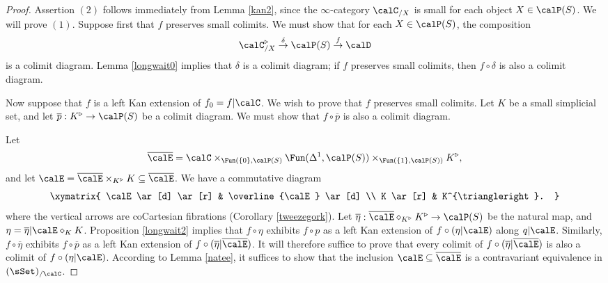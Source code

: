 \begin{proof}
Assertion $(2)$ follows immediately from Lemma \ref{kan2}, since the $\infty$-category
$\calC_{/X}$ is small for each object $X \in \calP(S)$. We will prove $(1)$. Suppose first that
$f$ preserves small colimits. We must show that for each $X \in \calP(S)$, the composition
$$ \calC_{/X}^{\triangleright} \stackrel{\delta}{\rightarrow} \calP(S) \stackrel{f}{\rightarrow} \calD$$
is a colimit diagram. Lemma \ref{longwait0} implies that $\delta$ is a colimit diagram; if $f$ preserves small colimits, then $f \circ \delta$ is also a colimit diagram.

Now suppose that $f$ is a left Kan extension of $f_0 = f | \calC$. We wish to prove that $f$
preserves small colimits. Let $K$ be a small simplicial set, and let
$\overline{p}: K^{\triangleright} \rightarrow \calP(S)$ be a colimit diagram. We must show that
$f \circ \overline{p}$ is also a colimit diagram.

Let $$\overline{\calE} = \calC \times_{ \Fun( \{0\}, \calP(S) } \Fun(\Delta^1,\calP(S) ) \times_{\Fun( \{1\}, \calP(S))} K^{\triangleright},$$
and let $\calE = \overline{\calE} \times_{ K^{\triangleright} } K \subseteq \overline{\calE}$. 
We have a commutative diagram
$$ \xymatrix{ \calE \ar[d] \ar[r] & \overline{\calE} \ar[d] \\
K \ar[r] & K^{\triangleright}. }$$
where the vertical arrows are coCartesian fibrations (Corollary \ref{tweezegork}). 
Let $\overline{\eta}: \overline{\calE} \diamond_{ K^{\triangleright} } K^{\triangleright} 
\rightarrow \calP(S)$ be the natural map, and $\eta = \overline{\eta} | \calE \diamond_{K} K$. 
Proposition \ref{longwait2} implies that $f \circ \eta$ exhibits $f \circ p$ as a left Kan extension of 
$f \circ (\eta | \calE)$ along $q|\calE$. Similarly, $f \circ \overline{\eta}$ exhibits $f \circ \overline{p}$ as a left Kan extension of $f \circ (\overline{\eta} | \overline{\calE})$. It will therefore suffice to prove
that every colimit of $f \circ (\overline{\eta} | \overline{\calE})$ is also a colimit of
$f \circ (\eta | \calE)$. According to Lemma \ref{natee}, it suffices to show that the inclusion
$\calE \subseteq \overline{\calE}$ is a contravariant equivalence in $(\sSet)_{/\calC}$.


\end{proof}
